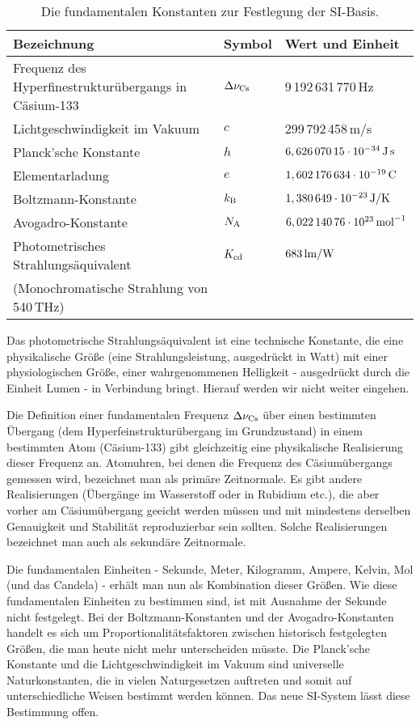 \begin{table}[htb]
\begin{tabular}{l|l|l}
Bezeichnung & Symbol & Wert und Einheit \\ \hline
Frequenz des Hyperfinestruktur\"ubergangs in C\"asium-133 & $\Delta \nu_{\rm Cs}$ &
        9\,192\,631\,770\,{\rm Hz} \\
Lichtgeschwindigkeit im Vakuum & $c$ & 299\,792\,458\,{\rm m/s} \\ 
Planck'sche Konstante & $h$ & $6,626\,070\,15 \cdot 10^{-34}\,{\rm J\,s}$ \\
Elementarladung & $e$ & $1,602\,176\,634 \cdot 10^{-19}\,{\rm C}$ \\
Boltzmann-Konstante & $k_{\rm B}$ & $1,380\,649 \cdot 10^{-23}\,{\rm J/K}$ \\
Avogadro-Konstante & $N_{\rm A}$ & $ 6,022\,140\,76 \cdot 10^{23}\,{\rm mol}^{-1}$ \\
Photometrisches Strahlungs\"aquivalent & $K_{\rm cd}$ & $683\,{\rm lm/W}$ \\[-0.1cm]
(Monochromatische Strahlung von 540\,THz) & &  \\ \hline        
\end{tabular}
\caption{\label{tab_SI}%
Die fundamentalen Konstanten zur Festlegung der SI-Basis.}
\end{table}

Das photometrische Strahlungs\"aquivalent ist eine technische Konstante, die eine physikalische
Gr\"o\ss e (eine Strahlungsleistung, ausgedr\"uckt in Watt) mit einer physiologischen Gr\"o\ss e,
einer wahrgenommenen Helligkeit - ausgedr\"uckt durch die Einheit Lumen - in Verbindung bringt. 
Hierauf werden wir nicht weiter eingehen. 

Die Definition einer fundamentalen Frequenz $\Delta \nu_{\rm Cs}$ \"uber einen bestimmten
\"Ubergang (dem Hyperfeinstruktur\"ubergang im Grundzustand)
 in einem bestimmten Atom (C\"asium-133) gibt gleichzeitig eine physikalische Realisierung
dieser Frequenz an. Atomuhren, bei denen die Frequenz des C\"asium\"ubergangs gemessen wird, 
bezeichnet man als \glqq prim\"are Zeitnormale\grqq. 
Es gibt andere Realisierungen (\"Uberg\"ange im Wasserstoff oder in Rubidium etc.),
die aber vorher am C\"asium\"ubergang geeicht werden m\"ussen und mit mindestens derselben
Genauigkeit und Stabilit\"at reproduzierbar sein sollten. Solche Realisierungen bezeichnet man
auch als \glqq sekund\"are Zeitnormale\grqq. 

Die fundamentalen Einheiten - Sekunde, Meter, Kilogramm, Ampere, Kelvin, Mol (und das Candela) -
erh\"alt man nun als Kombination dieser Gr\"o\ss en. Wie diese fundamentalen Einheiten zu bestimmen
sind, ist mit Ausnahme der Sekunde nicht festgelegt. Bei der Boltzmann-Konstanten und der Avogadro-Konstanten
handelt es sich um Proportionalit\"atsfaktoren zwischen historisch festgelegten Gr\"o\ss en, die
man heute nicht mehr unterscheiden m\"usste. Die Planck'sche Konstante und die Lichtgeschwindigkeit
im Vakuum sind universelle Naturkonstanten, die in vielen Naturgesetzen auftreten und somit
auf unterschiedliche Weisen bestimmt werden k\"onnen. Das neue SI-System l\"asst diese
Bestimmung offen.  


